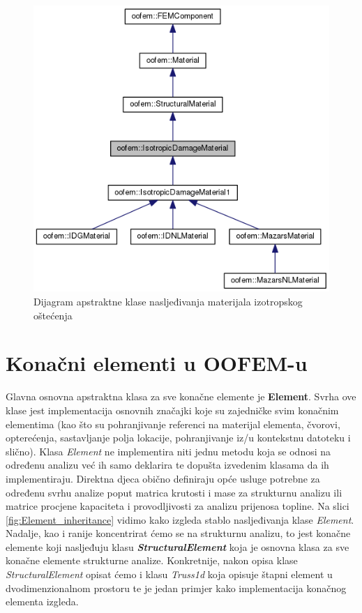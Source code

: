 \documentclass[a4paper,twoside,12pt]{memoir} %
\begin{document}
\begin{figure}[h!t]
\begin{center}
\includegraphics[scale=0.4]{pictures/chapter_oofem/IsotropicDamageMaterial_inheritance.png}
\caption{Dijagram apstraktne klase nasljeđivanja materijala izotropskog oštećenja \cite{oofem_reference}}
\label{fig:IsotropicDamageMaterial_inheritance}
\end{center}
\end{figure}


\section{Konačni elementi u OOFEM-u}
\label{poglavlje:finite_elements_in_oofem}
Glavna osnovna apstraktna klasa za sve konačne elemente je \textbf{Element}. Svrha ove klase jest implementacija osnovnih značajki koje su zajedničke svim konačnim elementima (kao što su pohranjivanje referenci na materijal elementa, čvorovi, opterećenja, sastavljanje polja lokacije, pohranjivanje iz/u kontekstnu datoteku i slično). Klasa \textit{Element} ne implementira niti jednu metodu koja se odnosi na određenu analizu već ih samo deklarira te dopušta izvedenim klasama da ih implementiraju. Direktna djeca obično definiraju opće usluge potrebne za određenu svrhu analize poput matrica krutosti i mase za strukturnu analizu ili matrice procjene kapaciteta i provodljivosti za analizu prijenosa topline. Na slici \ref{fig:Element_inheritance} vidimo kako izgleda stablo nasljeđivanja klase \textit{Element}. Nadalje, kao i ranije koncentrirat ćemo se na strukturnu analizu, to jest konačne elemente koji nasljeđuju klasu \textbf{\textit{StructuralElement}} koja je osnovna klasa za sve konačne elemente strukturne analize. Konkretnije, nakon opisa klase \textit{StructuralElement} opisat ćemo i klasu \textit{Truss1d} koja opisuje štapni element u dvodimenzionalnom prostoru te je jedan primjer kako implementacija konačnog elementa izgleda. \par
\end{document}
